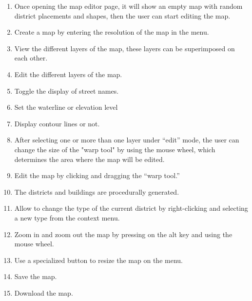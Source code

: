 \begin{enumerate}
  \item Once opening the map editor page, it will show an empty map with random district placements and shapes, then the user can start editing the map.
  \item Create a map by entering the resolution of the map in the menu.
  \item View the different layers of the map, these layers can be superimposed on each other.
  \item Edit the different layers of the map.
  \item Toggle the display of street names.
  \item Set the waterline or elevation level
  \item Display contour lines or not.
  \item After selecting one or more than one layer under ``edit'' mode, the user can change the size of the "warp tool" by using the mouse wheel, which determines the area where the map will be edited.
  \item Edit the map by clicking and dragging the ``warp tool.''
  \item The districts and buildings are procedurally generated.
  \item Allow to change the type of the current district by right-clicking and selecting a new type from the context menu.
  \item Zoom in and zoom out the map by pressing on the alt key and using the mouse wheel.
  \item Use a specialized button to resize the map on the menu.
  \item Save the map.
  \item Download the map.
\end{enumerate}
